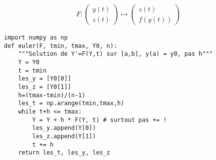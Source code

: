 \begin{align*}
F:
\left(
\begin{array}{c}
y(t)\\
z(t)
\end{array}
\right)
\mapsto
\left(\begin{array}{c}
z(t)\\
f(y(t))
\end{array}
\right)
\end{align*} 

%
%




\question{}



\begin{lstlisting}
import numpy as np
def euler(F, tmin, tmax, Y0, n):
    """Solution de Y'=F(Y,t) sur [a,b], y(a) = y0, pas h"""
    Y = Y0
    t = tmin
    les_y = [Y0[0]] 
    les_z = [Y0[1]] 
    h=(tmax-tmin)/(n-1)
    les_t = np.arange(tmin,tmax,h)
    while t+h <= tmax:
        Y = Y + h * F(Y, t) # surtout pas += !
        les_y.append(Y[0])
        les_z.append(Y[1])
        t += h
    return les_t, les_y, les_z
\end{lstlisting}

%
%
%
%
%
%
%

\question{}

